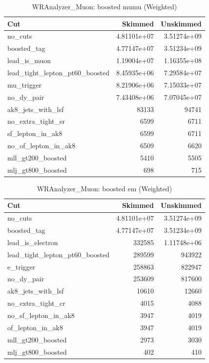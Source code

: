 \documentclass{article}
\begin{document}
\begin{table}[htbp]
\centering
\caption{WRAnalyzer\_Muon: boosted mumu (Weighted)}
\begin{tabular}{lrr}
\hline
Cut & Skimmed & Unskimmed \\
\hline
no\_cuts & 4.81101e+07 & 3.51274e+09 \\
boosted\_tag & 4.77147e+07 & 3.51234e+09 \\
lead\_is\_muon & 1.19004e+07 & 1.16355e+08 \\
lead\_tight\_lepton\_pt60\_boosted & 8.45935e+06 & 7.29584e+07 \\
mu\_trigger & 8.21906e+06 & 7.15033e+07 \\
no\_dy\_pair & 7.43408e+06 & 7.07045e+07 \\
ak8\_jets\_with\_lsf & 83133 & 94741 \\
no\_extra\_tight\_sr & 6599 & 6711 \\
sf\_lepton\_in\_ak8 & 6599 & 6711 \\
no\_of\_lepton\_in\_ak8 & 6509 & 6620 \\
mll\_gt200\_boosted & 5410 & 5505 \\
mlj\_gt800\_boosted & 698 & 715 \\
\hline
\end{tabular}
\end{table}

\begin{table}[htbp]
\centering
\caption{WRAnalyzer\_Muon: boosted em (Weighted)}
\begin{tabular}{lrr}
\hline
Cut & Skimmed & Unskimmed \\
\hline
no\_cuts & 4.81101e+07 & 3.51274e+09 \\
boosted\_tag & 4.77147e+07 & 3.51234e+09 \\
lead\_is\_electron & 332585 & 1.11748e+06 \\
lead\_tight\_lepton\_pt60\_boosted & 289599 & 943922 \\
e\_trigger & 258863 & 822947 \\
no\_dy\_pair & 253609 & 817600 \\
ak8\_jets\_with\_lsf & 10610 & 12660 \\
no\_extra\_tight\_cr & 4015 & 4088 \\
no\_sf\_lepton\_in\_ak8 & 3947 & 4019 \\
of\_lepton\_in\_ak8 & 3947 & 4019 \\
mll\_gt200\_boosted & 2973 & 3030 \\
mlj\_gt800\_boosted & 402 & 410 \\
\hline
\end{tabular}
\end{table}
\end{document}
